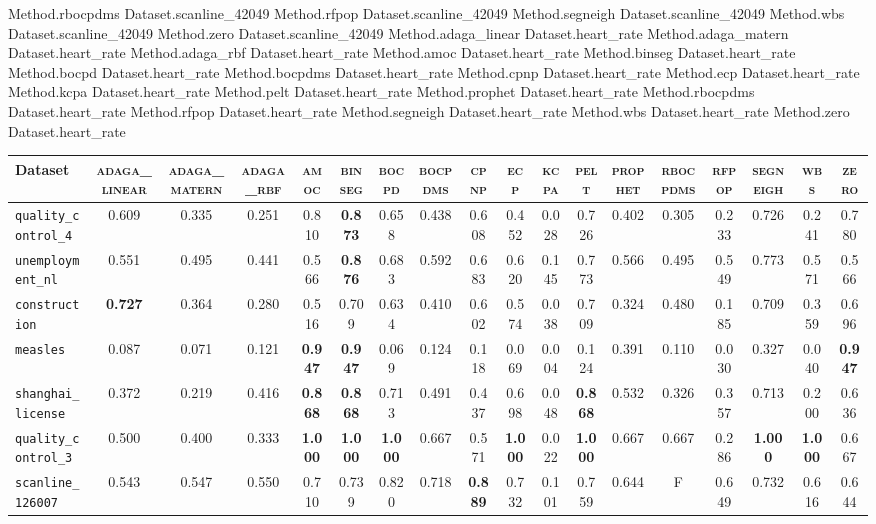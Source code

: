 Method.rbocpdms Dataset.scanline_42049
Method.rfpop Dataset.scanline_42049
Method.segneigh Dataset.scanline_42049
Method.wbs Dataset.scanline_42049
Method.zero Dataset.scanline_42049
Method.adaga_linear Dataset.heart_rate
Method.adaga_matern Dataset.heart_rate
Method.adaga_rbf Dataset.heart_rate
Method.amoc Dataset.heart_rate
Method.binseg Dataset.heart_rate
Method.bocpd Dataset.heart_rate
Method.bocpdms Dataset.heart_rate
Method.cpnp Dataset.heart_rate
Method.ecp Dataset.heart_rate
Method.kcpa Dataset.heart_rate
Method.pelt Dataset.heart_rate
Method.prophet Dataset.heart_rate
Method.rbocpdms Dataset.heart_rate
Method.rfpop Dataset.heart_rate
Method.segneigh Dataset.heart_rate
Method.wbs Dataset.heart_rate
Method.zero Dataset.heart_rate
\begin{tabular}{lccccccccccccccccc}
Dataset & \textsc{adaga_linear} & \textsc{adaga_matern} & \textsc{adaga_rbf} & \textsc{amoc} & \textsc{binseg} & \textsc{bocpd} & \textsc{bocpdms} & \textsc{cpnp} & \textsc{ecp} & \textsc{kcpa} & \textsc{pelt} & \textsc{prophet} & \textsc{rbocpdms} & \textsc{rfpop} & \textsc{segneigh} & \textsc{wbs} & \textsc{zero}\\
\toprule
\verb+quality_control_4+ & 0.609 & 0.335 & 0.251 & 0.810 & \textbf{0.873} & 0.658 & 0.438 & 0.608 & 0.452 & 0.028 & 0.726 & 0.402 & 0.305 & 0.233 & 0.726 & 0.241 & 0.780\\
\verb+unemployment_nl+ & 0.551 & 0.495 & 0.441 & 0.566 & \textbf{0.876} & 0.683 & 0.592 & 0.683 & 0.620 & 0.145 & 0.773 & 0.566 & 0.495 & 0.549 & 0.773 & 0.571 & 0.566\\
\verb+construction+ & \textbf{0.727} & 0.364 & 0.280 & 0.516 & 0.709 & 0.634 & 0.410 & 0.602 & 0.574 & 0.038 & 0.709 & 0.324 & 0.480 & 0.185 & 0.709 & 0.359 & 0.696\\
\verb+measles+ & 0.087 & 0.071 & 0.121 & \textbf{0.947} & \textbf{0.947} & 0.069 & 0.124 & 0.118 & 0.069 & 0.004 & 0.124 & 0.391 & 0.110 & 0.030 & 0.327 & 0.040 & \textbf{0.947}\\
\verb+shanghai_license+ & 0.372 & 0.219 & 0.416 & \textbf{0.868} & \textbf{0.868} & 0.713 & 0.491 & 0.437 & 0.698 & 0.048 & \textbf{0.868} & 0.532 & 0.326 & 0.357 & 0.713 & 0.200 & 0.636\\
\verb+quality_control_3+ & 0.500 & 0.400 & 0.333 & \textbf{1.000} & \textbf{1.000} & \textbf{1.000} & 0.667 & 0.571 & \textbf{1.000} & 0.022 & \textbf{1.000} & 0.667 & 0.667 & 0.286 & \textbf{1.000} & \textbf{1.000} & 0.667\\
\verb+scanline_126007+ & 0.543 & 0.547 & 0.550 & 0.710 & 0.739 & 0.820 & 0.718 & \textbf{0.889} & 0.732 & 0.101 & 0.759 & 0.644 & F & 0.649 & 0.732 & 0.616 & 0.644\\

\end{tabular}
